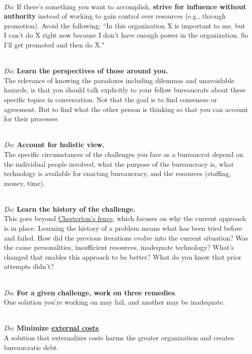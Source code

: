 \ \\
\textit{Do}: If there's something you want to accomplish, \textbf{strive for influence without authority} instead of working to gain control over resources (e.g., through promotion). Avoid the following: ``In this organization X is important to me, but I can't do X right now because I don't have enough power in the organization. So I'll get promoted and then do X."

\ \\
\textit{Do}: \textbf{Learn the perspectives of those around you.}\\
The relevance of knowing the paradoxes including dilemmas and unavoidable hazards, is that you should talk explicitly to your fellow bureaucrats about these specific topics in conversation. Not that the goal is to find consensus or agreement. But to find what the other person is thinking so that you can account for their processes

\ \\
\textit{Do}: \textbf{Account for holistic view.}\\
The specific circumstances of the challenges you face as a bureaucrat depend on the individual people involved, what the purpose of the bureaucracy is, what technology is available for enacting bureaucracy, and the resources (staffing, money, time). 

\ \\
\textit{Do}: \textbf{Learn the history of the challenge.}\\
This goes beyond \href{https://en.wikipedia.org/wiki/G._K._Chesterton#Chesterton's_fence}{Chesterton's fence}, 
\iftoggle{WPinmargin}{\marginpar{$>$Wikipedia: Chesterton's fence}}{}
which focuses on why the current approach is in place. Learning the history of a problem means what has been tried before and failed. How did the previous iterations evolve into the current situation? Was the cause personalities, insufficient resources, inadequate technology? What's changed that enables this approach to be better? What do you know that prior attempts didn't?

\ \\
\textit{Do}: \textbf{For a given challenge, work on three remedies}.\\
One solution you're working on may fail, and another may be inadequate. 

\ \\
\textit{Do}: \textbf{Minimize \href{https://en.wikipedia.org/wiki/Externality}{external costs}}.\\
\iftoggle{WPinmargin}{\marginpar{$>$Wikipedia: externality}}{}
A solution that externalizes costs harms the greater organization and creates bureaucratic debt.

